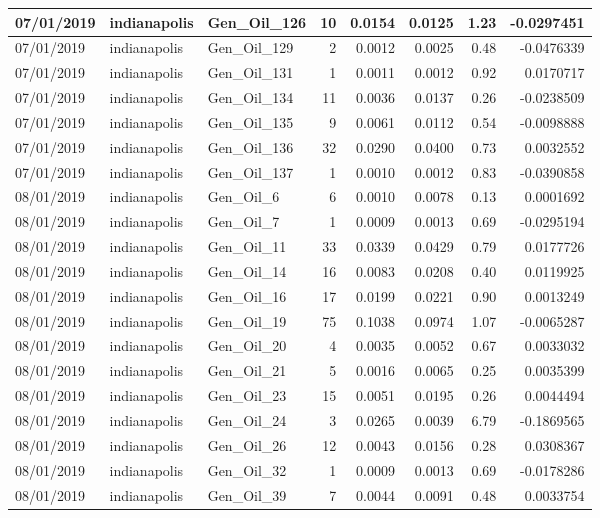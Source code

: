 \documentclass[
  letterpaper,
  DIV=11,
  numbers=noendperiod]{scrartcl}
\begin{document}
\begin{tabular}{l|l|l|r|r|r|r|r}
\hline
07/01/2019 & indianapolis & Gen\_Oil\_126 & 10 & 0.0154 & 0.0125 & 1.23 & -0.0297451\\
\hline
07/01/2019 & indianapolis & Gen\_Oil\_129 & 2 & 0.0012 & 0.0025 & 0.48 & -0.0476339\\
\hline
07/01/2019 & indianapolis & Gen\_Oil\_131 & 1 & 0.0011 & 0.0012 & 0.92 & 0.0170717\\
\hline
07/01/2019 & indianapolis & Gen\_Oil\_134 & 11 & 0.0036 & 0.0137 & 0.26 & -0.0238509\\
\hline
07/01/2019 & indianapolis & Gen\_Oil\_135 & 9 & 0.0061 & 0.0112 & 0.54 & -0.0098888\\
\hline
07/01/2019 & indianapolis & Gen\_Oil\_136 & 32 & 0.0290 & 0.0400 & 0.73 & 0.0032552\\
\hline
07/01/2019 & indianapolis & Gen\_Oil\_137 & 1 & 0.0010 & 0.0012 & 0.83 & -0.0390858\\
\hline
08/01/2019 & indianapolis & Gen\_Oil\_6 & 6 & 0.0010 & 0.0078 & 0.13 & 0.0001692\\
\hline
08/01/2019 & indianapolis & Gen\_Oil\_7 & 1 & 0.0009 & 0.0013 & 0.69 & -0.0295194\\
\hline
08/01/2019 & indianapolis & Gen\_Oil\_11 & 33 & 0.0339 & 0.0429 & 0.79 & 0.0177726\\
\hline
08/01/2019 & indianapolis & Gen\_Oil\_14 & 16 & 0.0083 & 0.0208 & 0.40 & 0.0119925\\
\hline
08/01/2019 & indianapolis & Gen\_Oil\_16 & 17 & 0.0199 & 0.0221 & 0.90 & 0.0013249\\
\hline
08/01/2019 & indianapolis & Gen\_Oil\_19 & 75 & 0.1038 & 0.0974 & 1.07 & -0.0065287\\
\hline
08/01/2019 & indianapolis & Gen\_Oil\_20 & 4 & 0.0035 & 0.0052 & 0.67 & 0.0033032\\
\hline
08/01/2019 & indianapolis & Gen\_Oil\_21 & 5 & 0.0016 & 0.0065 & 0.25 & 0.0035399\\
\hline
08/01/2019 & indianapolis & Gen\_Oil\_23 & 15 & 0.0051 & 0.0195 & 0.26 & 0.0044494\\
\hline
08/01/2019 & indianapolis & Gen\_Oil\_24 & 3 & 0.0265 & 0.0039 & 6.79 & -0.1869565\\
\hline
08/01/2019 & indianapolis & Gen\_Oil\_26 & 12 & 0.0043 & 0.0156 & 0.28 & 0.0308367\\
\hline
08/01/2019 & indianapolis & Gen\_Oil\_32 & 1 & 0.0009 & 0.0013 & 0.69 & -0.0178286\\
\hline
08/01/2019 & indianapolis & Gen\_Oil\_39 & 7 & 0.0044 & 0.0091 & 0.48 & 0.0033754\\

\end{tabular}
\end{document}
